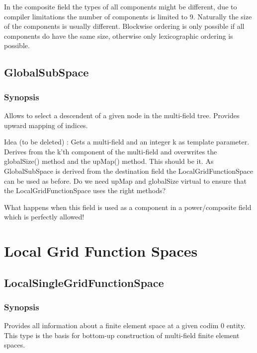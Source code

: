 \documentclass[11pt,a4paper,DIV11,%
notitlepage,oneside,abstracton,%
bibtotoc]{scrartcl}
\begin{document}
In the composite field the types of all components might be different,
due to compiler limitations the number of components is limited to
9. Naturally the size of the components is usually different. Blockwise
ordering is only possible if all components do have the same size,
otherwise only lexicographic ordering is possible.


\subsection{GlobalSubSpace}

\subsubsection{Synopsis}

Allows to select a descendent of a given node in the multi-field
tree. Provides upward mapping of indices.

Idea (to be deleted) : Gets a multi-field and an integer k as template
parameter. Derives from the k'th component of the multi-field and
overwrites the globalSize() method and the upMap() method. This should
be it. As GlobalSubSpace is derived from the destination field the
LocalGridFunctionSpace can be used as before. Do we need upMap and globalSize
virtual to ensure that the LocalGridFunctionSpace uses the right methods?

What happens when this field is used as a component in a
power/composite field which is perfectly allowed! 

\section{Local Grid Function Spaces}


\subsection{LocalSingleGridFunctionSpace}

\subsubsection{Synopsis}

Provides all information about a finite element space at a given codim
0 entity. This type is the basis for bottom-up construction of
multi-field finite element spaces.
\end{document}
